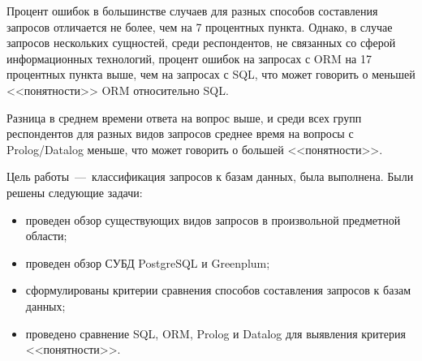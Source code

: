 Процент ошибок в большинстве случаев для разных способов составления запросов отличается не более, чем на 7 процентных пункта. Однако, в случае запросов нескольких сущностей, среди респондентов, не связанных со сферой информационных технологий, процент ошибок на запросах с ORM на 17 процентных пункта выше, чем на запросах с SQL, что может говорить о меньшей <<понятности>> ORM относительно SQL.
 
Разница в среднем времени ответа на вопрос выше, и среди всех групп респондентов для разных видов запросов среднее время на вопросы с Prolog/Datalog меньше, что может говорить о большей <<понятности>>.


Цель работы~---~классификация запросов к базам данных, была выполнена. Были решены следующие задачи:

\begin{itemize}
	\item проведен обзор существующих видов запросов в произвольной предметной области;
	\item проведен обзор СУБД PostgreSQL и Greenplum;
	\item сформулированы критерии сравнения способов составления запросов к базам данных;
	\item проведено сравнение SQL, ORM, Prolog и Datalog для выявления критерия <<понятности>>.
\end{itemize}
